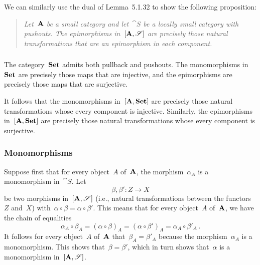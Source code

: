 We can similarly use the dual of Lemma~5.1.32 to show the following proposition:
\begin{quote}
	\itshape
	Let~$\mathbf{A}$ be a small category and let~$\cat{S}$ be a locally small category with pushouts.
	The epimorphisms in~$[\mathbf{A}, \mathscr{S}]$ are precisely those natural transformations that are an epimorphism in each component.
\end{quote}



\subsubsection{}

The category~$\mathbf{Set}$ admits both pullback and pushouts.
The monomorphisms in~$\mathbf{Set}$ are precisely those maps that are injective, and the epimorphisms are precisely those maps that are surjective.

It follows that the monomorphisms in~$[\mathbf{A}, \mathbf{Set}]$ are precisely those natural transformations whose every component is injective.
Similarly, the epimorphisms in~$[\mathbf{A}, \mathbf{Set}]$ are precisely those natural transformations whose every component is surjective.



\subsubsection{}


\subsubsection*{Monomorphisms}

Suppose first that for every object~$A$ of~$\mathbf{A}$, the morphism~$α_A$ is a monomorphism in~$\cat{S}$.
Let
\[
	β, β' \colon Z \to X
\]
be two morphisms in~$[\mathbf{A}, \mathscr{S}]$ (i.e., natural transformations between the functors~$Z$ and~$X$) with~$α ∘ β = α ∘ β'$.
This means that for every object~$A$ of~$\mathbf{A}$, we have the chain of equalities
\[
	α_A ∘ β_A
	=
	(α ∘ β)_A
	=
	(α ∘ β')_A
	=
	α_A ∘ β'_A \,.
\]
It follows for every object~$A$ of~$\mathbf{A}$ that~$β_A = β'_A$ because the morphism~$α_A$ is a monomorphism.
This shows that~$β = β'$, which in turn shows that~$α$ is a monomorphism in~$[\mathbf{A}, \mathscr{S}]$.

